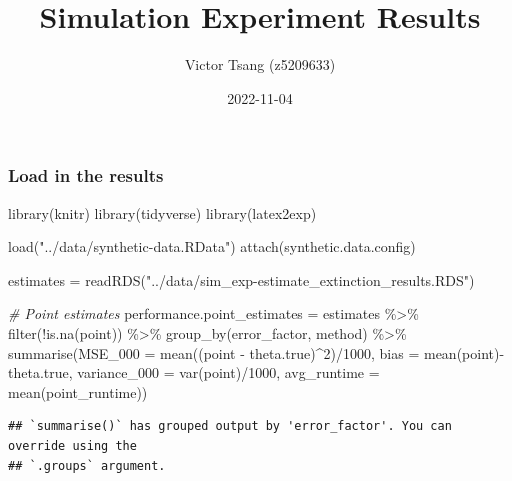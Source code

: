 \documentclass[
]{article}
\title{Simulation Experiment Results}
\author{Victor Tsang (z5209633)}
\date{2022-11-04}
\newenvironment{Shaded}{\begin{snugshade}}{\end{snugshade}}
\newcommand{\AttributeTok}[1]{\textcolor[rgb]{0.77,0.63,0.00}{#1}}
\newcommand{\CommentTok}[1]{\textcolor[rgb]{0.56,0.35,0.01}{\textit{#1}}}
\newcommand{\DecValTok}[1]{\textcolor[rgb]{0.00,0.00,0.81}{#1}}
\newcommand{\FunctionTok}[1]{\textcolor[rgb]{0.00,0.00,0.00}{#1}}
\newcommand{\NormalTok}[1]{#1}
\newcommand{\OtherTok}[1]{\textcolor[rgb]{0.56,0.35,0.01}{#1}}
\newcommand{\SpecialCharTok}[1]{\textcolor[rgb]{0.00,0.00,0.00}{#1}}
\newcommand{\StringTok}[1]{\textcolor[rgb]{0.31,0.60,0.02}{#1}}
\begin{document}
\maketitle

\hypertarget{load-in-the-results}{%
\subsubsection{Load in the results}\label{load-in-the-results}}

\begin{Shaded}
\begin{Highlighting}[]
\FunctionTok{library}\NormalTok{(knitr)}
\FunctionTok{library}\NormalTok{(tidyverse)}
\FunctionTok{library}\NormalTok{(latex2exp)}

\FunctionTok{load}\NormalTok{(}\StringTok{"../data/synthetic{-}data.RData"}\NormalTok{)}
\FunctionTok{attach}\NormalTok{(synthetic.data.config)}

\NormalTok{estimates }\OtherTok{=} \FunctionTok{readRDS}\NormalTok{(}\StringTok{"../data/sim\_exp{-}estimate\_extinction\_results.RDS"}\NormalTok{)}
\end{Highlighting}
\end{Shaded}

\begin{Shaded}
\begin{Highlighting}[]
\CommentTok{\# Point estimates}
\NormalTok{performance.point\_estimates }\OtherTok{=}\NormalTok{ estimates }\SpecialCharTok{\%\textgreater{}\%}
  \FunctionTok{filter}\NormalTok{(}\SpecialCharTok{!}\FunctionTok{is.na}\NormalTok{(point)) }\SpecialCharTok{\%\textgreater{}\%}
  \FunctionTok{group\_by}\NormalTok{(error\_factor, method) }\SpecialCharTok{\%\textgreater{}\%}
  \FunctionTok{summarise}\NormalTok{(}\AttributeTok{MSE\_000 =} \FunctionTok{mean}\NormalTok{((point }\SpecialCharTok{{-}}\NormalTok{ theta.true)}\SpecialCharTok{\^{}}\DecValTok{2}\NormalTok{)}\SpecialCharTok{/}\DecValTok{1000}\NormalTok{,}
            \AttributeTok{bias =} \FunctionTok{mean}\NormalTok{(point)}\SpecialCharTok{{-}}\NormalTok{theta.true,}
            \AttributeTok{variance\_000 =} \FunctionTok{var}\NormalTok{(point)}\SpecialCharTok{/}\DecValTok{1000}\NormalTok{,}
            \AttributeTok{avg\_runtime =} \FunctionTok{mean}\NormalTok{(point\_runtime))}
\end{Highlighting}
\end{Shaded}

\begin{verbatim}
## `summarise()` has grouped output by 'error_factor'. You can override using the
## `.groups` argument.
\end{verbatim}
\end{document}
